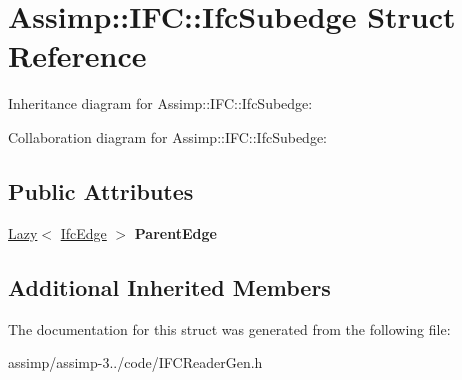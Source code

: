 \hypertarget{struct_assimp_1_1_i_f_c_1_1_ifc_subedge}{\section{Assimp\+:\+:I\+F\+C\+:\+:Ifc\+Subedge Struct Reference}
\label{struct_assimp_1_1_i_f_c_1_1_ifc_subedge}
}


Inheritance diagram for Assimp\+:\+:I\+F\+C\+:\+:Ifc\+Subedge\+:


Collaboration diagram for Assimp\+:\+:I\+F\+C\+:\+:Ifc\+Subedge\+:
\subsection*{Public Attributes}
\begin{DoxyCompactItemize}
\item 
\hypertarget{struct_assimp_1_1_i_f_c_1_1_ifc_subedge_a835147ae0a0248b2968606b3820d1ee2}{\hyperlink{struct_assimp_1_1_s_t_e_p_1_1_lazy}{Lazy}$<$ \hyperlink{struct_assimp_1_1_i_f_c_1_1_ifc_edge}{Ifc\+Edge} $>$ {\bfseries Parent\+Edge}}\label{struct_assimp_1_1_i_f_c_1_1_ifc_subedge_a835147ae0a0248b2968606b3820d1ee2}

\end{DoxyCompactItemize}
\subsection*{Additional Inherited Members}


The documentation for this struct was generated from the following file\+:\begin{DoxyCompactItemize}
\item 
assimp/assimp-\/3../code/I\+F\+C\+Reader\+Gen.\+h\end{DoxyCompactItemize}
